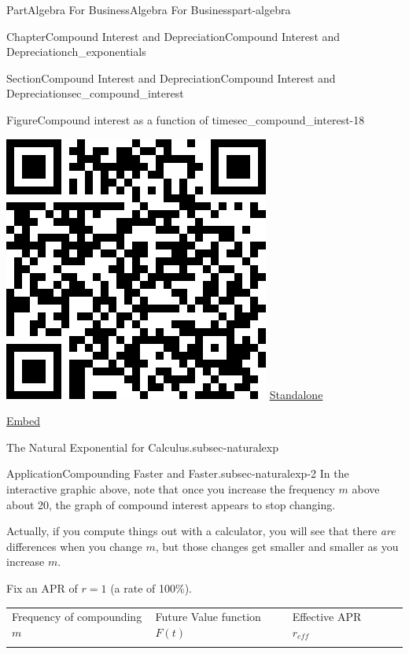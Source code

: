 \documentclass{tufte-book}
\newcommand{\tabularfont}{\relax}
\numberwithin{equation}{chapter}
\newcommand{\hrulemedium}{\noalign{\hrule height 0.07em}}
\begin{document}
\begin{partptx}{Part}{Algebra For Business}{}{Algebra For Business}{}{}{part-algebra}
\begin{chapterptx}{Chapter}{Compound Interest and Depreciation}{}{Compound Interest and Depreciation}{}{}{ch_exponentials}
\begin{sectionptx}{Section}{Compound Interest and Depreciation}{}{Compound Interest and Depreciation}{}{}{sec_compound_interest}
\begin{figureptx}{Figure}{Compound interest as a function of time}{sec_compound_interest-18}{}
\begin{sidebyside}{2}{0.075}{0.075}{0.17}
\begin{sbspanel}{0.21}
\includegraphics[width=\linewidth]{generated/qrcode/sec_compound_interest-18-2.png}
\href{http://webwork.bridgew.edu/oer/functions_at_work/sec_compound_interest-18-2.html}{Standalone}%
\par
\href{http://webwork.bridgew.edu/oer/functions_at_work/sec_compound_interest-18-2-if.html}{Embed}%
\end{sbspanel}%
\end{sidebyside}%
\tcblower
\end{figureptx}%
\begin{paragraphs}{The Natural Exponential for Calculus.}{subsec-naturalexp}%
\begin{insight}{Application}{Compounding Faster and Faster.}{subsec-naturalexp-2}%
In the interactive graphic above, note that once you increase the frequency \(m\) above about 20, the graph of compound interest appears to stop changing.%
\par
Actually, if you compute things out with a calculator, you will see that there \emph{are} differences when you change \(m\), but those changes get smaller and smaller as you increase \(m\).%
\par
Fix an APR of \(r=1\) (a rate  of 100\%).%
\begin{center}%
{\tabularfont%
\begin{tabular}{lBlBl}
Frequency of compounding \(m\)&Future Value function \(F(t)\)&Effective APR \(r_{eff}\)\tabularnewline\hrulemedium

\end{tabular}}
\end{center}
\end{insight}
\end{paragraphs}
\end{sectionptx}
\end{chapterptx}
\end{partptx}
\end{document}
